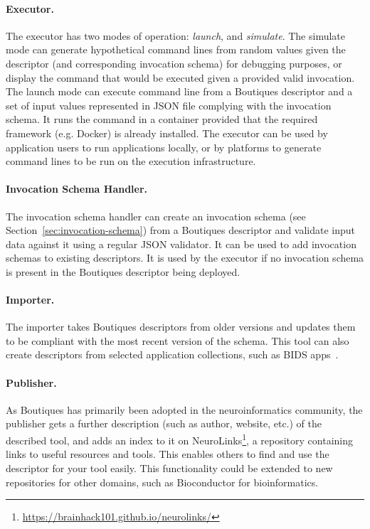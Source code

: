 \documentclass{article}
\newcommand{\boutiques}{Boutiques\xspace}
\begin{document}
\paragraph{Executor.} The executor has two modes of operation: \emph{launch}, and
\emph{simulate}. The simulate mode can generate hypothetical command lines from
random values given the descriptor (and corresponding invocation schema) for debugging
purposes, or display the command that would be executed given a provided valid
invocation. The launch mode can execute command line from a \boutiques descriptor and
a set of input values represented in JSON file complying with the invocation schema.
It runs the command in a container provided that the required framework (e.g. Docker)
is already installed. The executor can be used by application users to run
applications locally, or by platforms to generate command lines to be run on the
execution infrastructure.

\paragraph{Invocation Schema Handler.} The invocation schema handler can create an
invocation schema (see Section~\ref{sec:invocation-schema}) from a \boutiques descriptor
and validate input data against it using a regular JSON validator. It can be used to add
invocation schemas to existing descriptors. It is used by the executor if no invocation
schema is present in the \boutiques descriptor being deployed.

\paragraph{Importer.} The importer takes \boutiques descriptors from older versions and
updates them to be compliant with the most recent version of the schema. This tool can
also create descriptors from selected application collections, such as BIDS
apps~\cite{gorgolewski2017bids}.

\paragraph{Publisher.} As \boutiques has primarily been adopted in the neuroinformatics
community, the publisher gets a further description (such as author, website, etc.) of
the described tool, and adds an index to it on
NeuroLinks\footnote{\url{https://brainhack101.github.io/neurolinks/}}, a repository
containing links to useful resources and tools. This enables others to find and use the
descriptor for your tool easily. This functionality could be extended to
new repositories for other domains, such as Bioconductor for bioinformatics.
\end{document}
